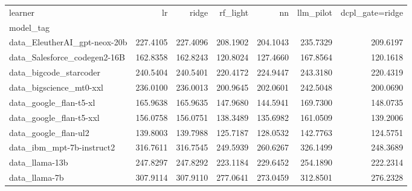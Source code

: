 \begin{tabular}{lrrrrrr}
\toprule
learner & lr & ridge & rf\_light & nn & llm\_pilot & dcpl\_gate=ridge \\
model_tag &  &  &  &  &  &  \\
\midrule
data\_EleutherAI\_gpt-neox-20b & 227.4105 & 227.4096 & 208.1902 & 204.1043 & 235.7329 & 209.6197 \\
data\_Salesforce\_codegen2-16B & 162.8358 & 162.8243 & 120.8024 & 127.4660 & 167.8564 & 120.1618 \\
data\_bigcode\_starcoder & 240.5404 & 240.5401 & 220.4172 & 224.9447 & 243.3180 & 220.4319 \\
data\_bigscience\_mt0-xxl & 236.0100 & 236.0013 & 200.9645 & 202.0601 & 242.5048 & 200.0690 \\
data\_google\_flan-t5-xl & 165.9638 & 165.9635 & 147.9680 & 144.5941 & 169.7300 & 148.0735 \\
data\_google\_flan-t5-xxl & 156.0758 & 156.0751 & 138.3489 & 135.6982 & 161.0509 & 139.2006 \\
data\_google\_flan-ul2 & 139.8003 & 139.7988 & 125.7187 & 128.0532 & 142.7763 & 124.5751 \\
data\_ibm\_mpt-7b-instruct2 & 316.7611 & 316.7545 & 249.5939 & 260.6267 & 326.1499 & 248.3689 \\
data\_llama-13b & 247.8297 & 247.8292 & 223.1184 & 229.6452 & 254.1890 & 222.2314 \\
data\_llama-7b & 307.9114 & 307.9110 & 277.0641 & 273.0459 & 312.8501 & 276.2328 \\
\bottomrule
\end{tabular}

